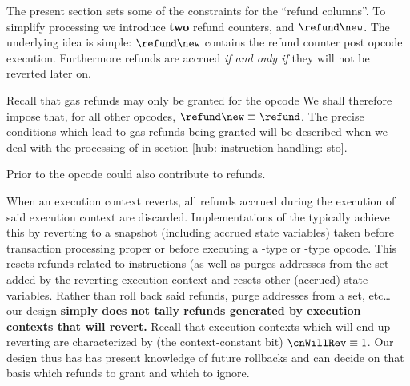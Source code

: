 The present section sets some of the constraints for the ``refund columns''.
To simplify processing we introduce \textbf{two} refund counters,  and $\refund\new$.
The underlying idea is simple: $\refund\new$ contains the refund counter post opcode execution.
Furthermore refunds are accrued \emph{if and only if} they will not be reverted later on.

Recall that gas refunds may only be granted for the
 opcode
We shall therefore impose that, for all other opcodes, $\refund \new \equiv \refund$.
The precise conditions which lead to gas refunds being granted will be described when we deal with the processing of  in section
\ref{hub: instruction handling: sto}.

\saNote{} Prior to \cite{EIP-3529} the  opcode could also contribute to refunds.

When an execution context reverts, all refunds accrued during the execution of said execution context are discarded.
Implementations of the \evm{} typically achieve this by reverting to a snapshot (including accrued state variables) taken before transaction processing proper or before executing a -type or -type opcode.
This resets refunds related to  instructions (as well as purges addresses from the  set added by the reverting execution context and resets other (accrued) state variables.
Rather than roll back said refunds, purge addresses from a  set, etc\dots{} our \zkEvm{} design \textbf{simply does not tally refunds generated by execution contexts that will revert.}
Recall that execution contexts which will end up reverting are characterized by (the context-constant bit) $\cnWillRev \equiv 1$.
Our \zkEvm{} design thus has has present knowledge of future rollbacks and can decide on that basis which refunds to grant and which to ignore.
